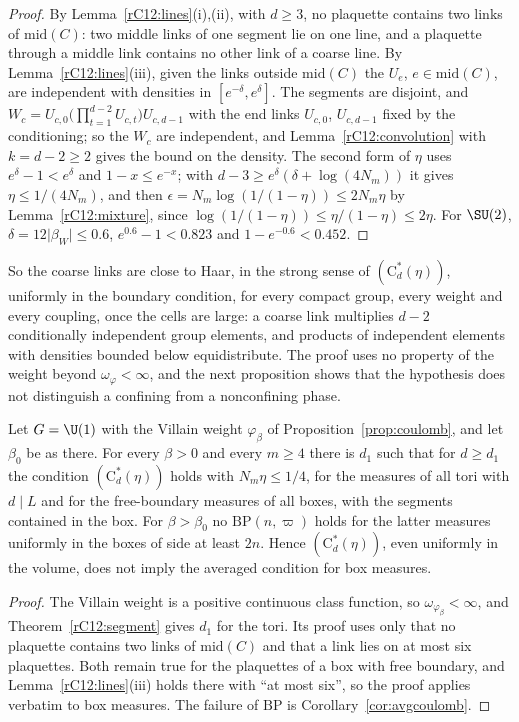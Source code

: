 \begin{proof}
By Lemma~\ref{rC12:lines}(i),(ii), with $d\ge3$, no plaquette contains
two links of $\mathrm{mid}(C)$: two middle links of one segment lie on one
line, and a plaquette through a middle link contains no other link of a
coarse line. By Lemma~\ref{rC12:lines}(iii), given the links outside
$\mathrm{mid}(C)$ the $U_e$, $e\in\mathrm{mid}(C)$, are independent with
densities in $[e^{-\delta},e^\delta]$. The segments are disjoint, and $W_c=
U_{c,0}\bigl(\prod_{t=1}^{d-2}U_{c,t}\bigr)U_{c,d-1}$ with the end links
$U_{c,0}$, $U_{c,d-1}$ fixed by the conditioning; so the $W_c$ are
independent, and Lemma~\ref{rC12:convolution} with $k=d-2\ge2$ gives the
bound on the density. The second form of $\eta$ uses $e^\delta-1<e^\delta$
and $1-x\le e^{-x}$; with $d-3\ge e^\delta(\delta+\log(4N_m))$ it gives
$\eta\le1/(4N_m)$, and then $\epsilon=N_m\log(1/(1-\eta))\le2N_m\eta$ by
Lemma~\ref{rC12:mixture}, since $\log(1/(1-\eta))\le\eta/(1-\eta)\le2\eta$.
For $\SU(2)$, $\delta=12\lvert\beta_W\rvert\le0.6$, $e^{0.6}-1<0.823$ and
$1-e^{-0.6}<0.452$.
\end{proof}

So the coarse links are close to Haar, in the strong sense of
$(\mathrm C^*_d(\eta))$, uniformly in the boundary condition, for every
compact group, every weight and every coupling, once the cells are large: a
coarse link multiplies $d-2$ conditionally independent group elements, and
products of independent elements with densities bounded below
equidistribute. The proof uses no property of the weight beyond
$\omega_\varphi<\infty$, and the next proposition shows that the
hypothesis does not distinguish a confining from a nonconfining phase.

\begin{proposition}\label{rC12:coulomb}
Let $G=\U(1)$ with the Villain weight $\varphi_\beta$ of
Proposition~\ref{prop:coulomb}, and let $\beta_0$ be as there. For every
$\beta>0$ and every $m\ge4$ there is $d_1$ such that for $d\ge d_1$ the
condition $(\mathrm C^*_d(\eta))$ holds with $N_m\eta\le1/4$, for the
measures of all tori with $d\mid L$ and for the free-boundary measures of
all boxes, with the segments contained in the box. For $\beta>\beta_0$ no
$\mathrm{BP}(n,\varpi)$ holds for the latter measures uniformly in the
boxes of side at least $2n$. Hence $(\mathrm C^*_d(\eta))$, even uniformly
in the volume, does not imply the averaged condition for box measures.
\end{proposition}

\begin{proof}
The Villain weight is a positive continuous class function, so
$\omega_{\varphi_\beta}<\infty$, and Theorem~\ref{rC12:segment} gives
$d_1$ for the tori. Its proof uses only that no plaquette contains two
links of $\mathrm{mid}(C)$ and that a link lies on at most six plaquettes.
Both remain true for the plaquettes of a box with free boundary, and
Lemma~\ref{rC12:lines}(iii) holds there with ``at most six'', so the proof
applies verbatim to box measures. The failure of $\mathrm{BP}$ is
Corollary~\ref{cor:avgcoulomb}.
\end{proof}

